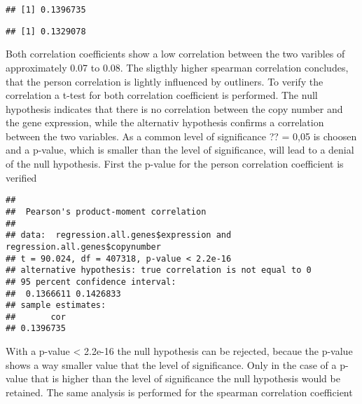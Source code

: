 \documentclass[]{article}
\newenvironment{Shaded}{\begin{snugshade}}{\end{snugshade}}
\newcommand{\CommentTok}[1]{\textcolor[rgb]{0.56,0.35,0.01}{\textit{#1}}}
\newcommand{\DataTypeTok}[1]{\textcolor[rgb]{0.13,0.29,0.53}{#1}}
\newcommand{\KeywordTok}[1]{\textcolor[rgb]{0.13,0.29,0.53}{\textbf{#1}}}
\newcommand{\NormalTok}[1]{#1}
\newcommand{\OperatorTok}[1]{\textcolor[rgb]{0.81,0.36,0.00}{\textbf{#1}}}
\newcommand{\StringTok}[1]{\textcolor[rgb]{0.31,0.60,0.02}{#1}}
\begin{document}
\begin{verbatim}
## [1] 0.1396735
\end{verbatim}

\begin{Shaded}
\end{Shaded}

\begin{verbatim}
## [1] 0.1329078
\end{verbatim}

Both correlation coefficients show a low correlation between the two
varibles of approximately 0.07 to 0.08. The sligthly higher spearman
correlation concludes, that the person correlation is lightly influenced
by outliners. To verify the correlation a t-test for both correlation
coefficient is performed. The null hypothesis indicates that there is no
correlation between the copy number and the gene expression, while the
alternativ hypothesis confirms a correlation between the two variables.
As a common level of significance ?? = 0,05 is choosen and a p-value,
which is smaller than the level of significance, will lead to a denial
of the null hypothesis. First the p-value for the person correlation
coefficient is verified

\begin{Shaded}
\end{Shaded}

\begin{verbatim}
## 
##  Pearson's product-moment correlation
## 
## data:  regression.all.genes$expression and regression.all.genes$copynumber
## t = 90.024, df = 407318, p-value < 2.2e-16
## alternative hypothesis: true correlation is not equal to 0
## 95 percent confidence interval:
##  0.1366611 0.1426833
## sample estimates:
##       cor 
## 0.1396735
\end{verbatim}

With a p-value \textless{} 2.2e-16 the null hypothesis can be rejected,
becaue the p-value shows a way smaller value that the level of
significance. Only in the case of a p-value that is higher than the
level of significance the null hypothesis would be retained. The same
analysis is performed for the spearman correlation coefficient
\end{document}
